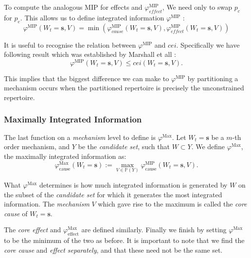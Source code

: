 To compute the analogous MIP for effects and $\varphi^{\text{MIP}}_{effect}$, We need only to swap $p_c$ for $p_e$. This allows us to define integrated information $\varphi^{\text{MIP}}$ \cite{oizumi2014phenomenology}:
\begin{equation}
\label{def:phi}
\varphi^{\text{MIP}}(W_t=\mathbf{s}, V) = \min \left( \varphi_{cause}^{\text{MIP}}(W_t=\mathbf{s}, V), \varphi_{effect}^{\text{MIP}}(W_t=\mathbf{s}, V)  \right) 
\end{equation}



It is useful to recognise the relation between $\varphi^{\text{MIP}}$ and $cei$. Specifically we have following result which was established by Marshall et all \cite{marshall2016integrated}:
\begin{equation}
\label{eq:bound_phi_cei}
\varphi^{\text{MIP}}(W_t=\mathbf{s}, V) \leq cei(W_t=\mathbf{s},V) .
\end{equation}

This implies that the biggest difference we can make to $\varphi^{\text{MIP}}$ by partitioning a mechanism occurs when the partitioned repertoire is precisely the unconstrained repertoire. 



\subsubsection{Maximally Integrated Information}
The last function on a \textit{mechanism} level to define is $\varphi^{\text{Max}}$. Let $W_t = \mathbf{s}$ be a $m$-th order mechanism, and $Y$ be the \textit{candidate set}, such that $W \subset Y$. We define $\varphi^{\text{Max}}$, the maximally integrated information \cite{oizumi2014phenomenology} as: 
\begin{equation}
\label{def:core_cause}
\varphi^{\text{Max}}_{\text{cause}}(W_t = \mathbf{s}):=\max \limits_{V \in \mathbb{P}(Y)}\varphi^{\text{MIP}}_{\text{cause}}(W_t = \mathbf{s}, V).
\end{equation}

What $\varphi^{\text{Max}}$ determines is how much integrated information is generated by $W$ on the subset of the \textit{candidate set} for which it generates the most integrated information. The \textit{mechanism} $V$ which gave rise to the maximum is called the \textit{core cause} of $W_t = \mathbf{s}$.

The \textit{core effect} and  $\varphi^{\text{Max}}_{\text{effect}}$ are defined similarly. Finally we finish  by setting $\varphi^{\text{Max}}$ to be the minimum of the two as before. It is important to note that we find the \textit{core cause} and \textit{effect separately}, and that these need not be the same set.

